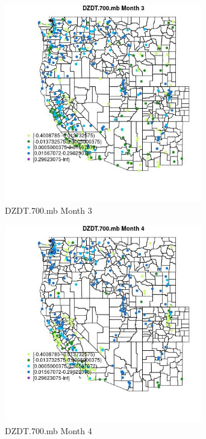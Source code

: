\begin{figure} 
\centering  
\includegraphics[width=0.77\textwidth]{Code_Outputs/Report_ML_input_PM25_Step4_part_e_de_duplicated_aves_compiled_2019-05-18wNAs_MapObsMo3DZDT700mb.jpg} 
\caption{\label{fig:Report_ML_input_PM25_Step4_part_e_de_duplicated_aves_compiled_2019-05-18wNAsMapObsMo3DZDT700mb}DZDT.700.mb Month 3} 
\end{figure} 
 

\begin{figure} 
\centering  
\includegraphics[width=0.77\textwidth]{Code_Outputs/Report_ML_input_PM25_Step4_part_e_de_duplicated_aves_compiled_2019-05-18wNAs_MapObsMo4DZDT700mb.jpg} 
\caption{\label{fig:Report_ML_input_PM25_Step4_part_e_de_duplicated_aves_compiled_2019-05-18wNAsMapObsMo4DZDT700mb}DZDT.700.mb Month 4} 
\end{figure} 
 


